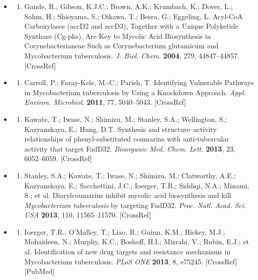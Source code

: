 \documentclass{article}
\begin{document}
\begin{itemize}
\begin{enumerate}
\end{enumerate}

\item \begin{enumerate}
\item 
Gande, R.; Gibson, K.J.C.; Brown, A.K.; Krumbach, K.; Dover, L.; Sahm, H.; Shioyama, S.; Oikawa, T.; Besra, G.; Eggeling, L. Acyl-CoA Carboxylases (accD2 and accD3), Together with a Unique Polyketide Synthase (Cg-pks), Are Key to Mycolic Acid Biosynthesis in Corynebacterianeae Such as Corynebacterium glutamicum and Mycobacterium tuberculosis. \textit{J. Biol. Chem.} \textbf{2004}, 279, 44847–44857. [CrossRef]

\end{enumerate}

\item \begin{enumerate}
\item 
Carroll, P.; Faray-Kele, M.-C.; Parish, T. Identifying Vulnerable Pathways in Mycobacterium tuberculosis by Using a Knockdown Approach. \textit{Appl. Environ. Microbiol.} \textbf{2011}, 77, 5040–5043. [CrossRef]

\end{enumerate}

\item \begin{enumerate}
\item 
Kawate, T.; Iwase, N.; Shimizu, M.; Stanley, S.A.; Wellington, S.; Kazyanskaya, E.; Hung, D.T. Synthesis and structure–activity relationships of phenyl-substituted coumarins with anti-tubercular activity that target FadD32. \textit{Bioorganic Med. Chem. Lett.} \textbf{2013}, 23, 6052–6059. [CrossRef]

\end{enumerate}

\item \begin{enumerate}
\item 
Stanley, S.A.; Kawate, T.; Iwase, N.; Shimizu, M.; Clatworthy, A.E.; Kazyanskaya, E.; Sacchettini, J.C.; Ioerger, T.R.; Siddiqi, N.A.; Minami, S.; et al. Diarylcoumarins inhibit mycolic acid biosynthesis and kill \textit{Mycobacterium tuberculosis} by targeting FadD32. \textit{Proc. Natl. Acad. Sci. USA} \textbf{2013}, 110, 11565–11570. [CrossRef]

\end{enumerate}

\item \begin{enumerate}
\item 
Ioerger, T.R.; O'Malley, T.; Liao, R.; Guinn, K.M.; Hickey, M.J.; Mohaideen, N.; Murphy, K.C.; Boshoff, H.I.; Mizrahi, V.; Rubin, E.J.; et al. Identification of new drug targets and resistance mechanisms in Mycobacterium tuberculosis. \textit{PLoS ONE} \textbf{2013}, 8, e75245. [CrossRef] [PubMed]


\end{enumerate}
\end{itemize}
\end{document}
